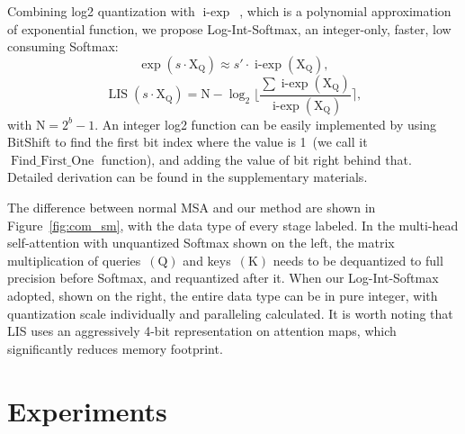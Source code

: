 \documentclass{article}
\begin{document}
Combining log2 quantization with $\operatorname{i-exp}$~\cite{kim2021bert}, which is a polynomial approximation of exponential function, we propose Log-Int-Softmax, an integer-only, faster, low consuming Softmax:
\begin{equation}
    \exp(s\cdot \textrm{X}_\textrm{Q}) \approx s'\cdot\operatorname{i-exp}(\textrm{X}_\textrm{Q}),
\end{equation}
\begin{equation}
    \operatorname{LIS}(s\cdot \textrm{X}_\textrm{Q}) = \textrm{N} -\log_\textrm{2}\lfloor\frac{\sum \operatorname{i-exp}(\textrm{X}_\textrm{Q})}{\operatorname{i-exp}(\textrm{X}_\textrm{Q})}\rceil,
\end{equation}
with $\textrm{N} = \textrm{2}^b-\textrm{1}$. An integer log2 function can be easily implemented by using BitShift to find the first bit index where the value is 1~(we call it $\operatorname{Find\_First\_One}$ function), and adding the value of bit right behind that. Detailed derivation can be found in the supplementary materials.


The difference between normal MSA and our method are shown in Figure~\ref{fig:com_sm}, with the data type of every stage labeled. In the multi-head self-attention with unquantized Softmax shown on the left, the matrix multiplication of queries~$(\textrm{Q})$ and keys~$(\textrm{K})$ needs to be dequantized to full precision before Softmax, and requantized after it. When our Log-Int-Softmax adopted, shown on the right, the entire data type can be in pure integer, with quantization scale individually and paralleling calculated. 
It is worth noting that LIS uses an aggressively 4-bit representation on attention maps, which significantly reduces memory footprint.



\section{Experiments}
\end{document}
